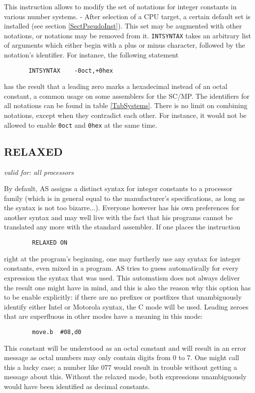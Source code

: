 \documentclass[12pt,twoside]{report}
\makeatletter
\newcommand{\tty}[1]{{\tt #1}}
\newcommand{\ttindex}[1]{\index{#1@{\tt #1}}}
\makeatother
\begin{document}
This instruction allows to modify the set of notations for integer constants
in various number systems. - After selection of a CPU target, a certain default
set is installed (see section \ref{SectPseudoInst}).  This set may be augmented
with other notations, or notations may be removed from it.  \tty{INTSYNTAX}
takes an arbitrary list of arguments which either begin with a plus or minus
character, followed by the notation's identifier.  For instance, the following
statement
\begin{verbatim}
       INTSYNTAX    -0oct,+0hex
\end{verbatim}
has the result that a leading zero marks a hexadecimal instead of an octal
constant, a common usage on some assemblers for the SC/MP.  The identifiers
for all notations can be found in table \ref{TabSystems}.  There is no limit on
combining notations, except when they contradict each other.  For instance, it
would not be allowed to enable \tty{0oct} and \tty{0hex} at the same time.


\subsection{RELAXED}
\label{SectRELAXED}
\ttindex{RELAXED}

{\em valid for: all processors}

By default, AS assigns a distinct syntax for integer constants to a
processor family (which is in general equal to the manufacturer's
specifications, as long as the syntax is not too bizarre...).
Everyone however has his own preferences for another syntax and may
well live with the fact that his programs cannot be translated any
more with the standard assembler.  If one places the instruction
\begin{verbatim}
        RELAXED ON
\end{verbatim}
right at the program's beginning, one may furtherly use any syntax
for integer constants, even mixed in a program.  AS tries to guess
automatically for every expression the syntax that was used.  This
automatism does not always deliver the result one might have in mind,
and this is also the reason why this option has to be enable
explicitly: if there are no prefixes or postfixes that unambiguously
identify either Intel or Motorola syntax, the C mode will be used.
Leading zeroes that are superfluous in other modes have a meaning in
this mode:
\begin{verbatim}
        move.b  #08,d0
\end{verbatim}
This constant will be understood as an octal constant and will result
in an error message as octal numbers may only contain digits from 0
to 7.  One might call this a lucky case; a number like 077 would
result in trouble without getting a message about this.  Without the
relaxed mode, both expressions unambiguously would have been
identified as decimal constants.
\end{document}

